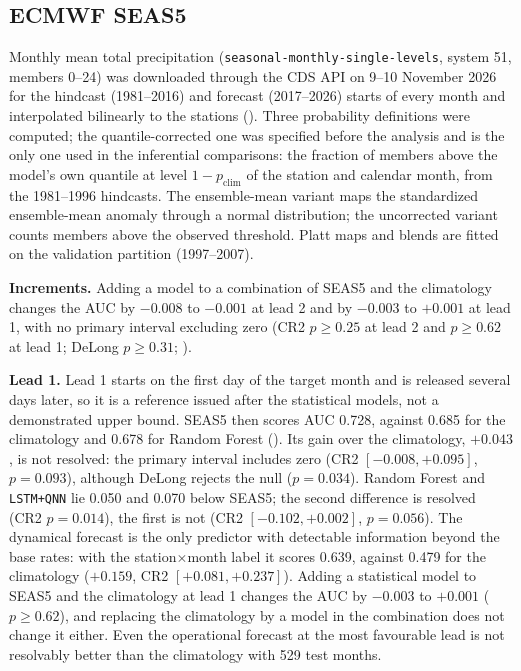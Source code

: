 \documentclass[11pt,a4paper]{article}
\begin{document}
\subsection{ECMWF SEAS5}
\label{app:seas5}

Monthly mean total precipitation (\texttt{seasonal-monthly-single-levels}, system 51, members 0--24) was downloaded through the CDS API on 9--10 November 2026 for the hindcast (1981--2016) and forecast (2017--2026) starts of every month and interpolated bilinearly to the stations (). Three probability definitions were computed; the quantile-corrected one was specified before the analysis and is the only one used in the inferential comparisons: the fraction of members above the model's own quantile at level $1-p_{\text{clim}}$ of the station and calendar month, from the 1981--1996 hindcasts. The ensemble-mean variant maps the standardized ensemble-mean anomaly through a normal distribution; the uncorrected variant counts members above the observed threshold. Platt maps and blends are fitted on the validation partition (1997--2007).

\textbf{Increments.} Adding a model to a combination of SEAS5 and the climatology changes the AUC by $-0.008$ to $-0.001$ at lead 2 and by $-0.003$ to $+0.001$ at lead 1, with no primary interval excluding zero (CR2 $p\ge0.25$ at lead 2 and $p\ge0.62$ at lead 1; DeLong $p\ge0.31$; ).

\textbf{Lead 1.} Lead 1 starts on the first day of the target month and is released several days later, so it is a reference issued after the statistical models, not a demonstrated upper bound. SEAS5 then scores AUC 0.728, against 0.685 for the climatology and 0.678 for Random Forest (). Its gain over the climatology, $+0.043$, is not resolved: the primary interval includes zero (CR2 $[-0.008,+0.095]$, $p=0.093$), although DeLong rejects the null ($p=0.034$). Random Forest and \texttt{LSTM+QNN} lie 0.050 and 0.070 below SEAS5; the second difference is resolved (CR2 $p=0.014$), the first is not (CR2 $[-0.102,+0.002]$, $p=0.056$). The dynamical forecast is the only predictor with detectable information beyond the base rates: with the station$\times$month label it scores 0.639, against 0.479 for the climatology ($+0.159$, CR2 $[+0.081,+0.237]$). Adding a statistical model to SEAS5 and the climatology at lead 1 changes the AUC by $-0.003$ to $+0.001$ ($p\ge0.62$), and replacing the climatology by a model in the combination does not change it either. Even the operational forecast at the most favourable lead is not resolvably better than the climatology with 529 test months.
\end{document}
